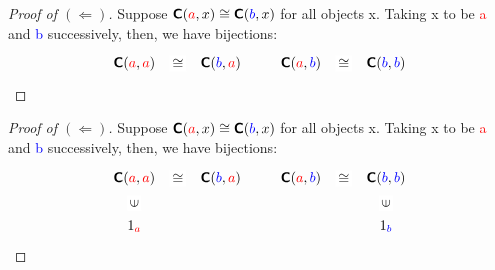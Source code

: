 \documentclass[tikz]{beamer}
\newcommand{\cat}[1]{\bm{ \mathsf{#1} }}
\newcommand{\cc}{\cat{C}}
\newcommand{\red}[1]{\textcolor{red}{#1}}
\newcommand{\blue}[1]{\textcolor{blue}{#1}}
\theoremstyle{definition}
\begin{document}
\begin{frame}[fragile]

	\begin{proof}[Proof of $(\Leftarrow)$]
		Suppose $\cc(\red{a}, x) \cong \cc(\blue{b}, x)$ for all objects x. Taking x to be \red{a} and \blue{b} successively, then, we have bijections: 
		\[
		\begin{aligned}
			\begin{tikzcd}[
  ar symbol/.style = {draw=none,"\textstyle#1" description,sloped},
  isomorphic/.style = {ar symbol={\cong}},
  ]
				\cc(\red{a}, \red{a}) \ar[r, isomorphic] & \cc(\blue{b}, \red{a}) 
			\end{tikzcd}
			\qquad
			\begin{tikzcd}[
  ar symbol/.style = {draw=none,"\textstyle#1" description,sloped},
  isomorphic/.style = {ar symbol={\cong}},
  ]
				\cc(\red{a}, \blue{b}) \ar[r, isomorphic] & \cc(\blue{b}, \blue{b})
			\end{tikzcd}
		\end{aligned}
		\]
		
	\end{proof}
\end{frame}

\begin{frame}[fragile]

	\begin{proof}[Proof of $(\Leftarrow)$]
		Suppose $\cc(\red{a}, x) \cong \cc(\blue{b}, x)$ for all objects x. Taking x to be \red{a} and \blue{b} successively, then, we have bijections: 
		\[
		\begin{aligned}
			\begin{tikzcd}[
  ar symbol/.style = {draw=none,"\textstyle#1" description,sloped},
  isomorphic/.style = {ar symbol={\cong}},
  inhabits/.style = {ar symbol={\in}}
  ]
				\cc(\red{a}, \red{a}) \ar[r, isomorphic] & \cc(\blue{b}, \red{a}) 
				\\ 1_{\red{a}}  \ar[u, inhabits]
			\end{tikzcd}
			\qquad
			\begin{tikzcd}[
  ar symbol/.style = {draw=none,"\textstyle#1" description,sloped},
  isomorphic/.style = {ar symbol={\cong}},
    inhabits/.style = {ar symbol={\in}}
  ]
				\cc(\red{a}, \blue{b}) \ar[r, isomorphic] & \cc(\blue{b}, \blue{b})
				\\ & 1_{\blue{b}} \ar[u, inhabits]
			\end{tikzcd}
		\end{aligned}
		\]
		
	\end{proof}
\end{frame}
\end{document}
